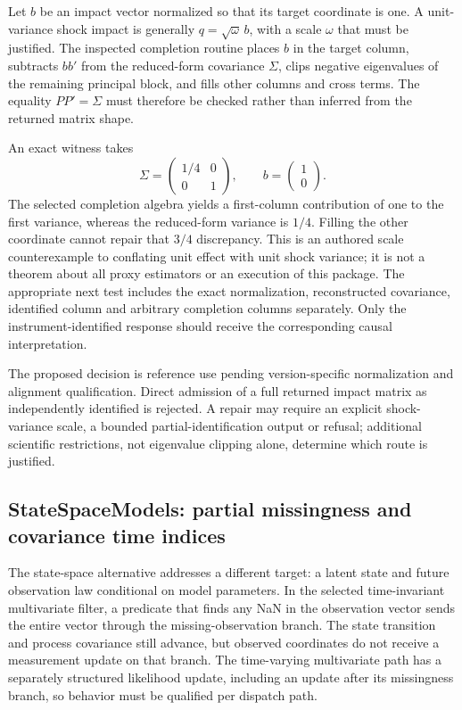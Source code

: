 Let $b$ be an impact vector normalized so that its target coordinate is one. A unit-variance shock impact is generally $q=\sqrt{\omega}\,b$, with a scale $\omega$ that must be justified. The inspected completion routine places $b$ in the target column, subtracts $bb'$ from the reduced-form covariance $\Sigma$, clips negative eigenvalues of the remaining principal block, and fills other columns and cross terms. The equality $PP'=\Sigma$ must therefore be checked rather than inferred from the returned matrix shape.~\citep{exec25_odyn_macro}

An exact witness takes
\[
 \Sigma=\begin{pmatrix}1/4&0\\0&1\end{pmatrix},\qquad
 b=\begin{pmatrix}1\\0\end{pmatrix}.
\]
The selected completion algebra yields a first-column contribution of one to the first variance, whereas the reduced-form variance is $1/4$. Filling the other coordinate cannot repair that $3/4$ discrepancy. This is an authored scale counterexample to conflating unit effect with unit shock variance; it is not a theorem about all proxy estimators or an execution of this package. The appropriate next test includes the exact normalization, reconstructed covariance, identified column and arbitrary completion columns separately. Only the instrument-identified response should receive the corresponding causal interpretation.~\citep{exec25_odyn_macro,exec25_odyn_choice}

The proposed decision is reference use pending version-specific normalization and alignment qualification. Direct admission of a full returned impact matrix as independently identified is rejected. A repair may require an explicit shock-variance scale, a bounded partial-identification output or refusal; additional scientific restrictions, not eigenvalue clipping alone, determine which route is justified.

\subsection{StateSpaceModels: partial missingness and covariance time indices}

The state-space alternative addresses a different target: a latent state and future observation law conditional on model parameters. In the selected time-invariant multivariate filter, a predicate that finds any NaN in the observation vector sends the entire vector through the missing-observation branch. The state transition and process covariance still advance, but observed coordinates do not receive a measurement update on that branch. The time-varying multivariate path has a separately structured likelihood update, including an update after its missingness branch, so behavior must be qualified per dispatch path.~\citep{exec25_odyn_ssm}

